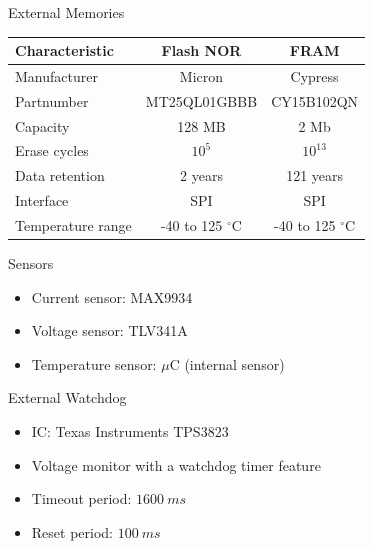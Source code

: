 \begin{frame}{External Memories}

    \begin{table}[!htb]
        \centering
        \begin{tabular}{lcc}
            \toprule[1.5pt]
            \textbf{Characteristic} & \textbf{Flash NOR} & \textbf{FRAM} \\
            \midrule
            Manufacturer      & Micron                 & Cypress \\
            Partnumber        & MT25QL01GBBB           & CY15B102QN \\
            Capacity          & 128 MB                 & 2 Mb \\
            Erase cycles      & $10^{5}$               & $10^{13}$ \\
            Data retention    & 2 years                & 121 years \\
            Interface         & SPI                    & SPI \\
            Temperature range & -40 to 125 $^{\circ}$C & -40 to 125 $^{\circ}$C \\
            \bottomrule[1.5pt]
        \end{tabular}
    \end{table}

\end{frame}

\begin{frame}{Sensors}

    \begin{itemize}
        \item Current sensor: MAX9934
        \vspace{0.3cm}
        \item Voltage sensor: TLV341A
        \vspace{0.3cm}
        \item Temperature sensor: $\mu$C (internal sensor)
        \vspace{0.3cm}
    \end{itemize}

\end{frame}

\begin{frame}{External Watchdog}

    \begin{itemize}
        \item IC: Texas Instruments TPS3823
        \vspace{0.5cm}
        \item Voltage monitor with a watchdog timer feature
        \vspace{0.5cm}
        \item Timeout period: $1600\ ms$
        \vspace{0.5cm}
        \item Reset period: $100\ ms$
    \end{itemize}

\end{frame}

